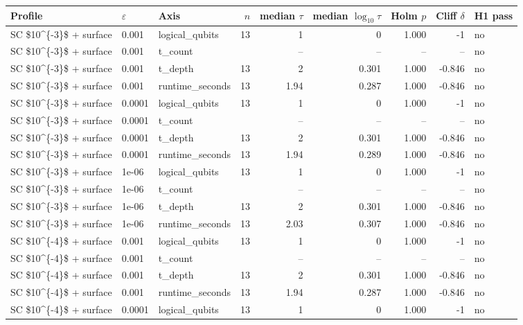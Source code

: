 \begin{tabular}{lllrrrrrl}
\toprule
Profile & $\varepsilon$ & Axis & $n$ & median $\tau$ & median $\log_{10}\tau$ & Holm $p$ & Cliff $\delta$ & H1 pass \\
\midrule
SC \$10\textasciicircum{}\{-3\}\$ + surface & 0.001 & logical\_qubits & 13 & 1 & 0 & 1.000 & -1 & no \\
SC \$10\textasciicircum{}\{-3\}\$ + surface & 0.001 & t\_count &  & -- & -- & -- & -- & no \\
SC \$10\textasciicircum{}\{-3\}\$ + surface & 0.001 & t\_depth & 13 & 2 & 0.301 & 1.000 & -0.846 & no \\
SC \$10\textasciicircum{}\{-3\}\$ + surface & 0.001 & runtime\_seconds & 13 & 1.94 & 0.287 & 1.000 & -0.846 & no \\
SC \$10\textasciicircum{}\{-3\}\$ + surface & 0.0001 & logical\_qubits & 13 & 1 & 0 & 1.000 & -1 & no \\
SC \$10\textasciicircum{}\{-3\}\$ + surface & 0.0001 & t\_count &  & -- & -- & -- & -- & no \\
SC \$10\textasciicircum{}\{-3\}\$ + surface & 0.0001 & t\_depth & 13 & 2 & 0.301 & 1.000 & -0.846 & no \\
SC \$10\textasciicircum{}\{-3\}\$ + surface & 0.0001 & runtime\_seconds & 13 & 1.94 & 0.289 & 1.000 & -0.846 & no \\
SC \$10\textasciicircum{}\{-3\}\$ + surface & 1e-06 & logical\_qubits & 13 & 1 & 0 & 1.000 & -1 & no \\
SC \$10\textasciicircum{}\{-3\}\$ + surface & 1e-06 & t\_count &  & -- & -- & -- & -- & no \\
SC \$10\textasciicircum{}\{-3\}\$ + surface & 1e-06 & t\_depth & 13 & 2 & 0.301 & 1.000 & -0.846 & no \\
SC \$10\textasciicircum{}\{-3\}\$ + surface & 1e-06 & runtime\_seconds & 13 & 2.03 & 0.307 & 1.000 & -0.846 & no \\
SC \$10\textasciicircum{}\{-4\}\$ + surface & 0.001 & logical\_qubits & 13 & 1 & 0 & 1.000 & -1 & no \\
SC \$10\textasciicircum{}\{-4\}\$ + surface & 0.001 & t\_count &  & -- & -- & -- & -- & no \\
SC \$10\textasciicircum{}\{-4\}\$ + surface & 0.001 & t\_depth & 13 & 2 & 0.301 & 1.000 & -0.846 & no \\
SC \$10\textasciicircum{}\{-4\}\$ + surface & 0.001 & runtime\_seconds & 13 & 1.94 & 0.287 & 1.000 & -0.846 & no \\
SC \$10\textasciicircum{}\{-4\}\$ + surface & 0.0001 & logical\_qubits & 13 & 1 & 0 & 1.000 & -1 & no \\

\end{tabular}
